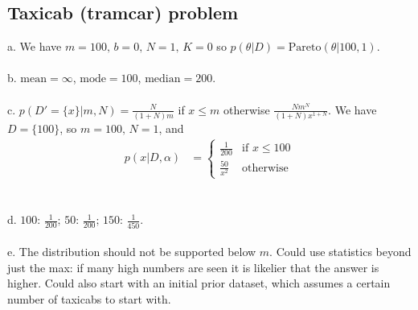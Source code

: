 \documentclass{article}
\begin{document}
\subsection{Taxicab (tramcar) problem}
a. We have $m=100,\, b=0,\, N=1,\, K=0$ so $p(\theta|D) = \mathrm{Pareto}(\theta|100, 1)$.\\\\
b. $\mathrm{mean} = \infty$, $\mathrm{mode} = 100$, $\mathrm{median} = 200$.\\\\
c. $p(D'=\{x\}|m,N) = \frac{N}{(1+N)m}$ if $x\leq m$ otherwise $\frac{Nm^N}{(1+N)x^{1+N}}$. We have $D=\{100\}$, so $m=100,\,N=1$, and
\begin{align*}
p(x|D,\alpha) &= \begin{cases}
\frac{1}{200} &\text{if $x\leq100$}\\
\frac{50}{x^{2}} &\text{otherwise}
\end{cases}
\end{align*}\\\\
d. $100:\,\frac{1}{200};\,50:\,\frac{1}{200};\,150:\,\frac{1}{450}$.\\\\
e. The distribution should not be supported below $m$. Could use statistics beyond just the max: if many high numbers are seen it is likelier that the answer is higher. Could also start with an initial prior dataset, which assumes a certain number of taxicabs to start with.
\end{document}

